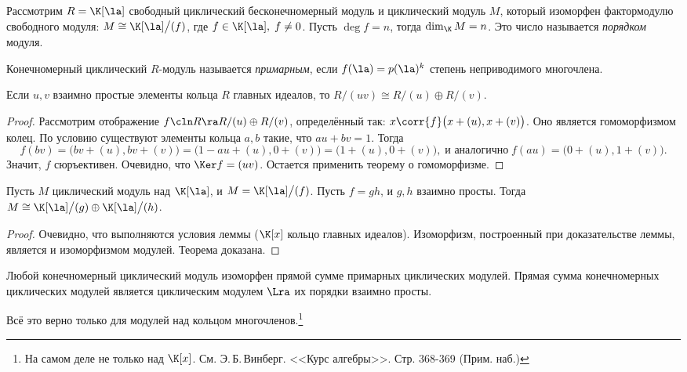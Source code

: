 \documentclass[a4paper]{article}
\begin{document}
Рассмотрим $R=\K[\la]$ свободный циклический бесконечномерный модуль и циклический модуль $M$,
который изоморфен фактормодулю свободного модуля: $M \cong \K[\la]\bigl/(f)$, где $f \in \K[\la], \;
f \neq 0$. Пусть $\deg f = n$, тогда $\dim_\K M=n$. Это число называется \emph{\emph{порядком}} модуля.

\begin{df}
Конечномерный циклический $R$-модуль называется \emph{примарным}, если $f(\la)=p(\la)^k$
степень неприводимого многочлена.
\end{df}

\begin{lemma}
Если $u, v$ взаимно простые элементы кольца $R$ главных идеалов, то $R/(uv)\cong R/(u) \oplus R/(v)$.
\end{lemma}
\begin{proof}
Рассмотрим отображение $f\cln R \ra R/(u) \oplus R/(v)$, определённый так: $x \corr{f} \bigl(x + (u),
x+(v)\bigr)$.  Оно является гомоморфизмом колец. По условию существуют элементы кольца $a, b$ такие, что
$au+bv=1$. Тогда
$$f(bv)=\bigl(bv+(u),bv+(v)\bigr)=\bigl(1-au+(u),0+(v)\bigr)=\bigl(1+(u),0+(v)\bigr), \; \text{и аналогично} \; f(au)=\bigl(0+(u),1+(v)\bigr).$$
Значит, $f$ сюръективен. Очевидно, что $\Ker f = (uv)$. Остается применить теорему о гомоморфизме.
\end{proof}
\begin{theorem}
Пусть $M$ циклический модуль над $\K[\la]$, и $M = \K[\la]\bigr/(f)$. Пусть $f=gh$, и $g, h$ взаимно
просты. Тогда $M \cong \K[\la]\bigl/(g) \oplus \K[\la]\bigl/(h)$.
\end{theorem}
\begin{proof}
Очевидно, что выполняются условия леммы ($\K[x]$ кольцо главных идеалов). Изоморфизм,  построенный при
доказательстве леммы, является и изоморфизмом модулей. Теорема доказана.
\end{proof}

\begin{imp}Любой конечномерный циклический модуль изоморфен прямой сумме примарных циклических  модулей. Прямая сумма конечномерных циклических модулей
является циклическим модулем $\Lra$ их порядки взаимно просты.
\end{imp}

\begin{note}
Всё это верно только для модулей над кольцом многочленов.\footnote{На самом деле не только над $\K[x]$.
См. Э.\,Б.\,Винберг. <<Курс алгебры>>. Стр. 368-369 (Прим. наб.)}
\end{note}
\end{document}

